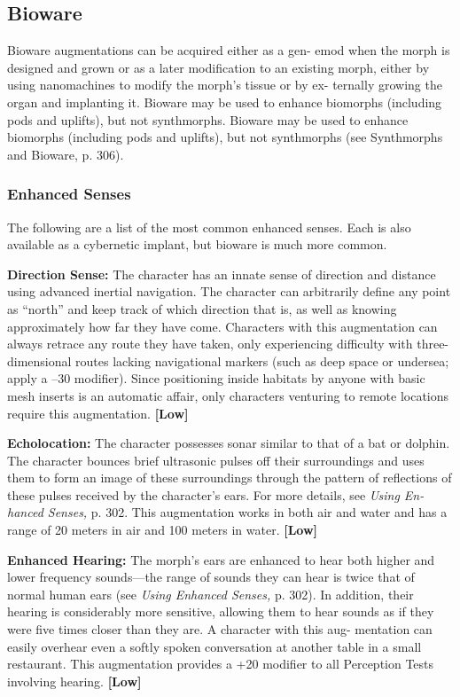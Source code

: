 \subsection{Bioware}

Bioware augmentations can be acquired either as a gen-
emod when the morph is designed and grown or as a 
later modification to an existing morph, either by using 
nanomachines to modify the morph's tissue or by ex-
ternally growing the organ and implanting it. Bioware 
may be used to enhance biomorphs (including pods and 
uplifts), but not synthmorphs. Bioware may be used to 
enhance biomorphs (including pods and uplifts), but not 
synthmorphs (see Synthmorphs and Bioware, p. 306).

\subsubsection{Enhanced Senses}

The following are a list of the most common enhanced 
senses. Each is also available as a cybernetic implant, 
but bioware is much more common.

\textbf{Direction Sense:} The character has an innate sense 
of direction and distance using advanced inertial 
navigation. The character can arbitrarily define any 
point as ``north'' and keep track of which direction 
that is, as well as knowing approximately how far 
they have come. Characters with this augmentation 
can always retrace any route they have taken, only 
experiencing difficulty with three-dimensional routes 
lacking navigational markers (such as deep space or 
undersea; apply a –30 modifier). Since positioning 
inside habitats by anyone with basic mesh inserts is an 
automatic affair, only characters venturing to remote 
locations require this augmentation. \textbf{[Low]}

\textbf{Echolocation:} The character possesses sonar similar 
to that of a bat or dolphin. The character bounces 
brief ultrasonic pulses off their surroundings and uses 
them to form an image of these surroundings through 
the pattern of reflections of these pulses received by 
the character's ears. For more details, see \textit{Using En-}
\textit{hanced Senses,} p. 302. This augmentation works in 
both air and water and has a range of 20 meters in air 
and 100 meters in water. \textbf{[Low]}

\textbf{Enhanced Hearing:} The morph's ears are enhanced 
to hear both higher and lower frequency sounds—the 
range of sounds they can hear is twice that of normal 
human ears (see \textit{Using Enhanced Senses,} p. 302). In 
addition, their hearing is considerably more sensitive, 
allowing them to hear sounds as if they were five 
times closer than they are. A character with this aug-
mentation can easily overhear even a softly spoken 
conversation at another table in a small restaurant. 
This augmentation provides a +20 modifier to all 
Perception Tests involving hearing. \textbf{[Low]}

